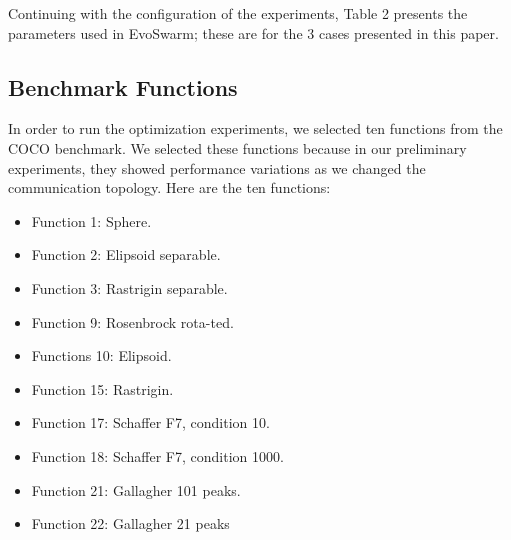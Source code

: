 \documentclass[runningheads]{llncs}
\begin{document}
Continuing with the configuration of the experiments, Table 2 presents the
parameters used in EvoSwarm; these are for the 3 cases presented in this paper.

\begin{table}[h]
\centering
\caption{Parameters for EvoSwarm}
\label{table:1}
\end{table}

\subsection{Benchmark Functions}

In order to run the optimization experiments, we selected ten functions from the
COCO benchmark. We selected these functions because in our preliminary
experiments, they showed performance variations as we changed the communication
topology. Here are the ten functions:

\begin{multicols}{2}
\begin{itemize}

    \item Function 1: Sphere.
    \item Function 2: Elipsoid separable.
    \item Function 3: Rastrigin separable.
    \item Function 9: Rosenbrock rota-ted.
    \item Functions 10: Elipsoid.
    \item Function 15: Rastrigin.
    \item Function 17: Schaffer F7, condition 10.
    \item Function 18: Schaffer F7, condition 1000.
    \item Function 21: Gallagher 101 peaks.
    \item Function 22: Gallagher 21 peaks

\end{itemize}
\end{multicols}
\end{document}
